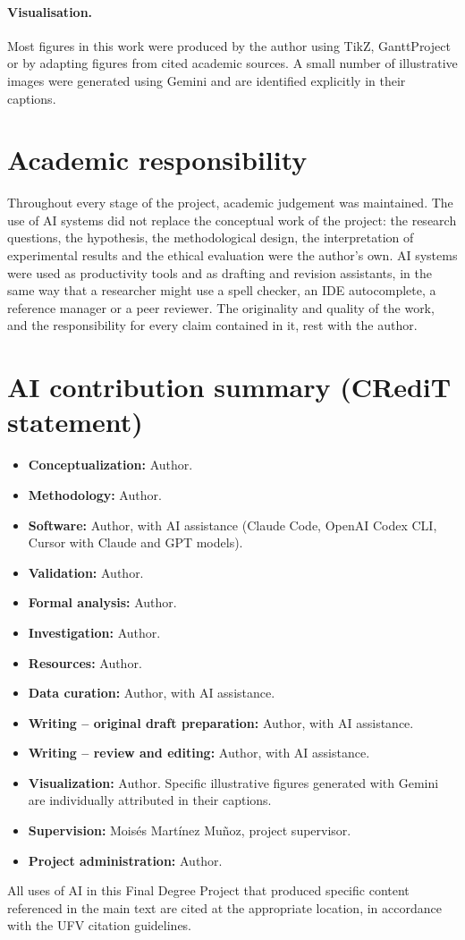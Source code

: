 \paragraph{Visualisation.} Most figures in this work were produced by the author using TikZ, GanttProject or by adapting
figures from cited academic sources. A small number of illustrative images were generated using
Gemini and are identified explicitly in their captions.

\section*{Academic responsibility}

Throughout every stage of the project, academic judgement was maintained. The use of AI systems did
not replace the conceptual work of the project: the research questions, the hypothesis, the
methodological design, the interpretation of experimental results and the ethical evaluation were
the author's own. AI systems were used as productivity tools and as drafting and revision
assistants, in the same way that a researcher might use a spell checker, an IDE autocomplete, a
reference manager or a peer reviewer. The originality and quality of the work, and the
responsibility for every claim contained in it, rest with the author.

\section*{AI contribution summary (CRediT statement)}

\begin{itemize}
    \item \textbf{Conceptualization:} Author.
    \item \textbf{Methodology:} Author.
    \item \textbf{Software:} Author, with AI assistance (Claude Code, OpenAI
          Codex CLI, Cursor with Claude and GPT models).
    \item \textbf{Validation:} Author.
    \item \textbf{Formal analysis:} Author.
    \item \textbf{Investigation:} Author.
    \item \textbf{Resources:} Author.
    \item \textbf{Data curation:} Author, with AI assistance.
    \item \textbf{Writing -- original draft preparation:} Author, with AI
          assistance.
    \item \textbf{Writing -- review and editing:} Author, with AI assistance.
    \item \textbf{Visualization:} Author. Specific illustrative figures
          generated with Gemini are individually attributed in their captions.
    \item \textbf{Supervision:} Mois\'es Mart\'inez Mu\~noz, project supervisor.
    \item \textbf{Project administration:} Author.
\end{itemize}

All uses of AI in this Final Degree Project that produced specific content referenced in the main
text are cited at the appropriate location, in accordance with the UFV citation guidelines.